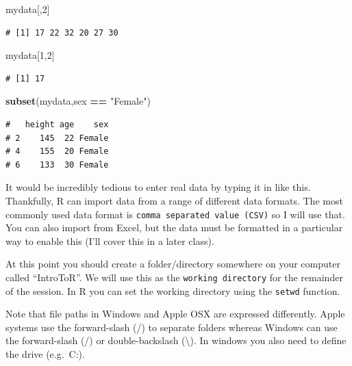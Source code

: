\documentclass[
  a4paperpaper,
]{book}
\newenvironment{Shaded}{\begin{snugshade}}{\end{snugshade}}
\newcommand{\DecValTok}[1]{\textcolor[rgb]{0.00,0.00,0.81}{#1}}
\newcommand{\KeywordTok}[1]{\textcolor[rgb]{0.13,0.29,0.53}{\textbf{#1}}}
\newcommand{\NormalTok}[1]{#1}
\newcommand{\OperatorTok}[1]{\textcolor[rgb]{0.81,0.36,0.00}{\textbf{#1}}}
\newcommand{\StringTok}[1]{\textcolor[rgb]{0.31,0.60,0.02}{#1}}
\begin{document}
\begin{Shaded}
\begin{Highlighting}[]
\NormalTok{mydata[,}\DecValTok{2}\NormalTok{]}
\end{Highlighting}
\end{Shaded}

\begin{verbatim}
# [1] 17 22 32 20 27 30
\end{verbatim}

\begin{Shaded}
\begin{Highlighting}[]
\NormalTok{mydata[}\DecValTok{1}\NormalTok{,}\DecValTok{2}\NormalTok{]}
\end{Highlighting}
\end{Shaded}

\begin{verbatim}
# [1] 17
\end{verbatim}

\begin{Shaded}
\begin{Highlighting}[]
\KeywordTok{subset}\NormalTok{(mydata,sex }\OperatorTok{==}\StringTok{ "Female"}\NormalTok{)}
\end{Highlighting}
\end{Shaded}

\begin{verbatim}
#   height age    sex
# 2    145  22 Female
# 4    155  20 Female
# 6    133  30 Female
\end{verbatim}

It would be incredibly tedious to enter real data by typing it in like this. Thankfully, R can import data from a range of different data formats. The most commonly used data format is \texttt{comma\ separated\ value\ (CSV)} so I will use that. You can also import from Excel, but the data must be formatted in a particular way to enable this (I'll cover this in a later class).

At this point you should create a folder/directory somewhere on your computer called ``IntroToR''. We will use this as the \texttt{working\ directory} for the remainder of the session. In R you can set the working directory using the \texttt{setwd} function.

Note that file paths in Windows and Apple OSX are expressed differently. Apple systems use the forward-slash (/) to separate folders whereas Windows can use the forward-slash (/) or double-backslash (\textbackslash). In windows you also need to define the drive (e.g.~C:).
\end{document}

